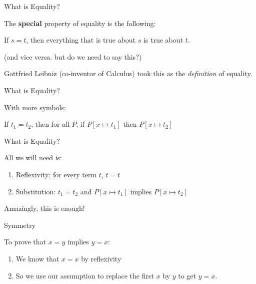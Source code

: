 \documentclass[xetex,aspectratio=169,14pt,hyperref={pdfpagelabels=true,pdflang={en-GB}}]{beamer}
\begin{document}
\begin{frame}
  {What is Equality?}

  The \textbf{special} property of equality is the following:

  \bigskip

  \begin{center}
    If $s = t$, then everything that is true about $s$ is true about $t$.
  \end{center}

  \pause
  \bigskip

  \textcolor{black!60}{(and vice versa. but do we need to say this?)}

  \pause
  \bigskip

  Gottfried Leibniz (co-inventor of Calculus) took this as the
  \emph{definition} of equality.
\end{frame}

\begin{frame}
  {What is Equality?}

  With more symbols:
  \begin{center}
    If $t_1 = t_2$, then for all $P$, if $P[x \mapsto t_1]$ then $P[x \mapsto t_2]$
  \end{center}

\end{frame}

\begin{frame}
  {What is Equality?}

  All we will need is:
  \begin{enumerate}
  \item Reflexivity: for every term $t$, $t = t$
  \item Substitution: $t_1 = t_2$ and $P[x \mapsto t_1]$ implies $P[x \mapsto t_2]$
  \end{enumerate}

  \bigskip

  Amazingly, this is enough!
\end{frame}

\begin{frame}
  {Symmetry}

  To prove that $x = y$ implies $y = x$:
  \begin{enumerate}
  \item We know that $x = x$ by reflexivity
  \item So we use our assumption to replace the first $x$ by $y$ to get $y = x$.
  \end{enumerate}
\end{frame}
\end{document}
